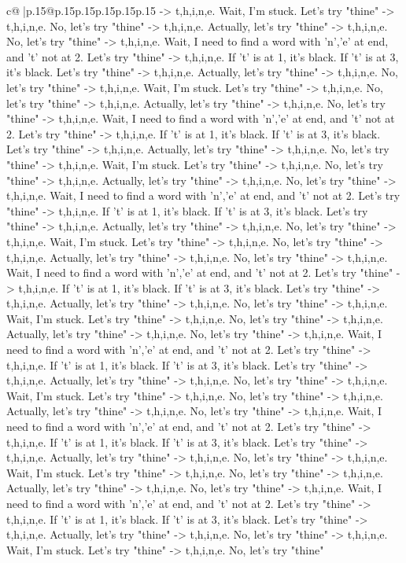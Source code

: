\documentclass{article}
\begin{document}
{\begin{supertabular}{c@{$\;$}|p{.15\linewidth}@{}p{.15\linewidth}p{.15\linewidth}p{.15\linewidth}p{.15\linewidth}p{.15\linewidth}}
{{{{-}> t,h,i,n,e. Wait, I'm stuck. Let's try "thine" {-}> t,h,i,n,e. No, let's try "thine" {-}> t,h,i,n,e. Actually, let's try "thine" {-}> t,h,i,n,e. No, let's try "thine" {-}> t,h,i,n,e. Wait, I need to find a word with 'n','e' at end, and 't' not at 2. Let's try "thine" {-}> t,h,i,n,e. If 't' is at 1, it's black. If 't' is at 3, it's black. Let's try "thine" {-}> t,h,i,n,e. Actually, let's try "thine" {-}> t,h,i,n,e. No, let's try "thine" {-}> t,h,i,n,e. Wait, I'm stuck. Let's try "thine" {-}> t,h,i,n,e. No, let's try "thine" {-}> t,h,i,n,e. Actually, let's try "thine" {-}> t,h,i,n,e. No, let's try "thine" {-}> t,h,i,n,e. Wait, I need to find a word with 'n','e' at end, and 't' not at 2. Let's try "thine" {-}> t,h,i,n,e. If 't' is at 1, it's black. If 't' is at 3, it's black. Let's try "thine" {-}> t,h,i,n,e. Actually, let's try "thine" {-}> t,h,i,n,e. No, let's try "thine" {-}> t,h,i,n,e. Wait, I'm stuck. Let's try "thine" {-}> t,h,i,n,e. No, let's try "thine" {-}> t,h,i,n,e. Actually, let's try "thine" {-}> t,h,i,n,e. No, let's try "thine" {-}> t,h,i,n,e. Wait, I need to find a word with 'n','e' at end, and 't' not at 2. Let's try "thine" {-}> t,h,i,n,e. If 't' is at 1, it's black. If 't' is at 3, it's black. Let's try "thine" {-}> t,h,i,n,e. Actually, let's try "thine" {-}> t,h,i,n,e. No, let's try "thine" {-}> t,h,i,n,e. Wait, I'm stuck. Let's try "thine" {-}> t,h,i,n,e. No, let's try "thine" {-}> t,h,i,n,e. Actually, let's try "thine" {-}> t,h,i,n,e. No, let's try "thine" {-}> t,h,i,n,e. Wait, I need to find a word with 'n','e' at end, and 't' not at 2. Let's try "thine" {-}> t,h,i,n,e. If 't' is at 1, it's black. If 't' is at 3, it's black. Let's try "thine" {-}> t,h,i,n,e. Actually, let's try "thine" {-}> t,h,i,n,e. No, let's try "thine" {-}> t,h,i,n,e. Wait, I'm stuck. Let's try "thine" {-}> t,h,i,n,e. No, let's try "thine" {-}> t,h,i,n,e. Actually, let's try "thine" {-}> t,h,i,n,e. No, let's try "thine" {-}> t,h,i,n,e. Wait, I need to find a word with 'n','e' at end, and 't' not at 2. Let's try "thine" {-}> t,h,i,n,e. If 't' is at 1, it's black. If 't' is at 3, it's black. Let's try "thine" {-}> t,h,i,n,e. Actually, let's try "thine" {-}> t,h,i,n,e. No, let's try "thine" {-}> t,h,i,n,e. Wait, I'm stuck. Let's try "thine" {-}> t,h,i,n,e. No, let's try "thine" {-}> t,h,i,n,e. Actually, let's try "thine" {-}> t,h,i,n,e. No, let's try "thine" {-}> t,h,i,n,e. Wait, I need to find a word with 'n','e' at end, and 't' not at 2. Let's try "thine" {-}> t,h,i,n,e. If 't' is at 1, it's black. If 't' is at 3, it's black. Let's try "thine" {-}> t,h,i,n,e. Actually, let's try "thine" {-}> t,h,i,n,e. No, let's try "thine" {-}> t,h,i,n,e. Wait, I'm stuck. Let's try "thine" {-}> t,h,i,n,e. No, let's try "thine" {-}> t,h,i,n,e. Actually, let's try "thine" {-}> t,h,i,n,e. No, let's try "thine" {-}> t,h,i,n,e. Wait, I need to find a word with 'n','e' at end, and 't' not at 2. Let's try "thine" {-}> t,h,i,n,e. If 't' is at 1, it's black. If 't' is at 3, it's black. Let's try "thine" {-}> t,h,i,n,e. Actually, let's try "thine" {-}> t,h,i,n,e. No, let's try "thine" {-}> t,h,i,n,e. Wait, I'm stuck. Let's try "thine" {-}> t,h,i,n,e. No, let's try "thine" }}}
\end{supertabular}}
\end{document}
